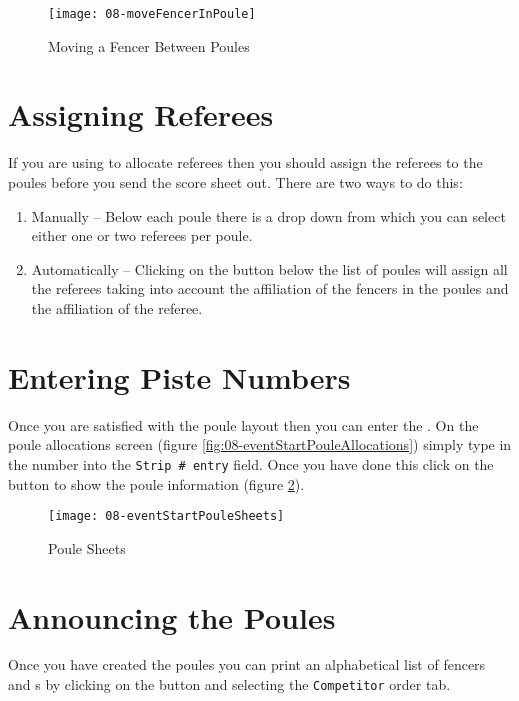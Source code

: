 \documentclass[a4paper,11pt]{memoir}
\begin{document}
\begin{figure}[!ht]
 \centering
 \texttt{[image: 08-moveFencerInPoule]}
 \caption{Moving a Fencer Between Poules} \label{fig:08-moveFencerInPoule}
\end{figure}

\section{Assigning Referees}

If you are using \fencingtime{} to allocate referees then you should assign the referees to the poules before you send the score sheet out. There are two ways to do this:
\begin{enumerate}
 \item Manually -- Below each poule there is a drop down from which you can select either one or two referees per poule.
 \item Automatically -- Clicking on the  button below the list of poules will assign all the referees taking into account the affiliation of the fencers in the poules and the affiliation of the referee.
\end{enumerate}

\section{Entering Piste Numbers}

Once you are satisfied with the poule layout then you can enter the . On the poule allocations screen (figure \ref{fig:08-eventStartPouleAllocations}) simply type in the number into the \texttt{Strip \# entry} field. Once you have done this click on the  button to show the poule information (figure \ref{fig:08-eventStartPouleSheets}).

\begin{figure}[!ht]
 \centering
 \texttt{[image: 08-eventStartPouleSheets]}
 \caption{Poule Sheets} \label{fig:08-eventStartPouleSheets}
\end{figure}

\section{Announcing the Poules}

Once you have created the poules you can print an alphabetical list of fencers and s by clicking on the  button and selecting the \texttt{Competitor} order tab. 
\end{document}
